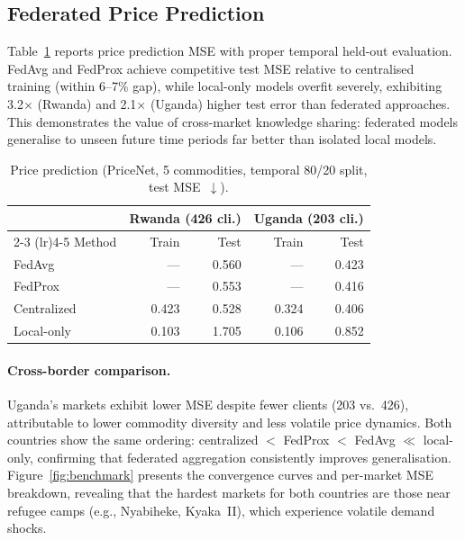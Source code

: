 \documentclass{article}
\begin{document}
\subsection{Federated Price Prediction}

Table~\ref{tab:price} reports price prediction MSE with proper temporal held-out evaluation.
FedAvg and FedProx achieve competitive test MSE relative to centralised training (within 6--7\% gap), while local-only models overfit severely, exhibiting 3.2$\times$ (Rwanda) and 2.1$\times$ (Uganda) higher test error than federated approaches.
This demonstrates the value of cross-market knowledge sharing: federated models generalise to unseen future time periods far better than isolated local models.

\begin{table}[t]
    \centering
    \caption{Price prediction (PriceNet, 5 commodities, temporal 80/20 split, test MSE~$\downarrow$).}
    \label{tab:price}
    \begin{tabular}{@{}lrrrr@{}}
        \toprule
        & \multicolumn{2}{c}{Rwanda (426 cli.)} & \multicolumn{2}{c}{Uganda (203 cli.)} \\
        \cmidrule(lr){2-3} \cmidrule(lr){4-5}
        Method & Train & Test & Train & Test \\
        \midrule
        FedAvg & --- & 0.560 & --- & 0.423 \\
        FedProx & --- & 0.553 & --- & 0.416 \\
        Centralized & 0.423 & 0.528 & 0.324 & 0.406 \\
        Local-only & 0.103 & 1.705 & 0.106 & 0.852 \\
        \bottomrule
    \end{tabular}
\end{table}

\paragraph{Cross-border comparison.}
Uganda's markets exhibit lower MSE despite fewer clients (203 vs.\ 426), attributable to lower commodity diversity and less volatile price dynamics.
Both countries show the same ordering: centralized $<$ FedProx $<$ FedAvg $\ll$ local-only, confirming that federated aggregation consistently improves generalisation.
Figure~\ref{fig:benchmark} presents the convergence curves and per-market MSE breakdown, revealing that the hardest markets for both countries are those near refugee camps (e.g., Nyabiheke, Kyaka~II), which experience volatile demand shocks.
\end{document}
